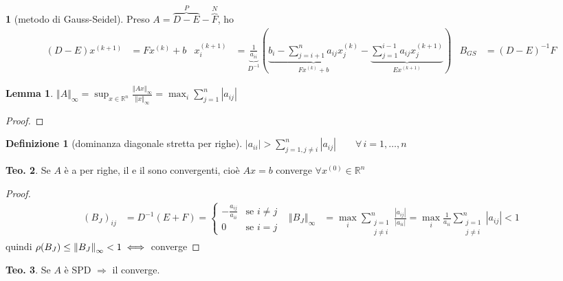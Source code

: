 \documentclass[a4paper,10pt]{article}
\theoremstyle{definition}
\newcommand{\re}{\mathbb{R}} %
\theoremstyle{indentdefinition}
\newtheorem{defn}{Definizione}[section]
\theoremstyle{indenttheorem}
\newtheorem{thm}{Teo.}
\newtheorem{lem}{Lemma}
\theoremstyle{myremark}
\theoremstyle{indentgeneral}
\newtheorem{lyxalgorithm}[thm]{\protect\algorithmname}
\theoremstyle{plain}
\theoremstyle{plain}
\begin{document}
\begin{lyxalgorithm}[metodo di Gauss-Seidel]
\label{def:metodo-di-gauss-seidel}\textup{Preso $A=\overset{P}{\overbrace{D-E}}-\overset{N}{\overbrace{F}}$,
ho
\begin{align*}
\left(D-E\right)x^{\left(k+1\right)} & =Fx^{\left(k\right)}+b & x_{i}^{\left(k+1\right)} & =\underbrace{\frac{1}{a_{ii}}}_{D^{-1}}\left(\underbrace{b_{i}-\sum_{j=i+1}^{n}a_{ij}x_{j}^{\left(k\right)}}_{Fx^{(k)}+b}-\underbrace{\sum_{j=1}^{i-1}a_{ij}x_{j}^{\left(k+1\right)}}_{Ex^{(k+1)}}\right) & B_{GS} & =\left(D-E\right)^{-1}F
\end{align*}
}
\end{lyxalgorithm}

\begin{lem}
$\left\Vert A\right\Vert _{\infty}=\sup_{x\in\mathbb{R}^{n}}\frac{\left\Vert Ax\right\Vert _{\infty}}{\left\Vert x\right\Vert _{\infty}}=\max_{i}\sum_{j=1}^{n}\left|a_{ij}\right|$
\end{lem}
\begin{proof}
\end{proof}

\begin{defn}[dominanza diagonale stretta per righe]
\label{def:dominanza-diagonale-stretta}$\left|a_{ii}\right|>\sum_{j=1,j\neq i}^{n}\left|a_{ij}\right|\qquad\forall\,i=1,\ldots,n$ 
\end{defn}


\begin{thm}
Se $A$ è a  per righe,
il  e il 
sono convergenti, cioè $Ax=b$ converge $\forall x^{(0)}\in\re^n$
\end{thm}

\begin{proof}
\begin{align*}
\left(B_{J}\right)_{ij} & =D^{-1}\left(E+F\right)=\begin{cases}
-\frac{a_{ij}}{a_{ii}} & \text{se }i\neq j\\
0 & \text{se }i=j
\end{cases} & \left\Vert B_{J}\right\Vert _{\infty} & =\max_{i}\sum_{\substack{j=1\\
j\neq i
}
}^{n}\frac{\left|a_{ij}\right|}{\left|a_{ii}\right|}=\max_{i}\frac{1}{a_{ii}}\sum_{\substack{j=1\\
j\neq i
}
}^{n}{\left|a_{ij}\right|}<1
\end{align*}
quindi $\rho(B_J)\le \norm{B_J}_\infty<1  \iff$ converge
\end{proof}
\begin{thm}
Se $A$ è SPD $\Longrightarrow$ il 
converge.
\end{thm}
\end{document}
